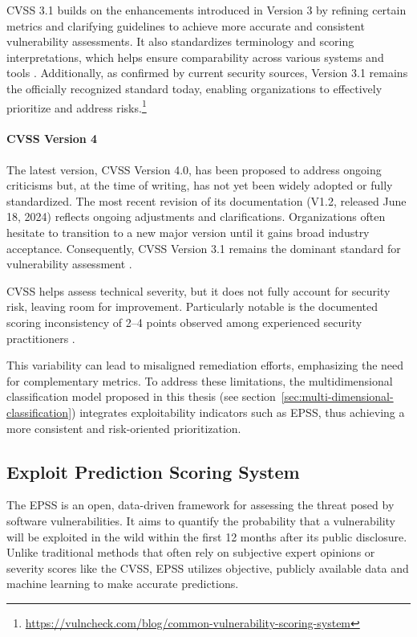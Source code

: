 \ac{CVSS} 3.1 builds on the enhancements introduced in Version 3 by refining certain metrics and clarifying guidelines to achieve more accurate and consistent vulnerability assessments. It also standardizes terminology and scoring interpretations, which helps ensure comparability across various systems and tools \autocite{first_cvss_2024}. Additionally, as confirmed by current security sources, Version 3.1 remains the officially recognized standard today, enabling organizations to effectively prioritize and address risks.\footnote{\url{https://vulncheck.com/blog/common-vulnerability-scoring-system}}

\paragraph{CVSS Version 4}
\label{par:cvss-v4}

The latest version, \ac{CVSS} Version 4.0, has been proposed to address ongoing criticisms but, at the time of writing, has not yet been widely adopted or fully standardized. The most recent revision of its documentation (V1.2, released June 18, 2024) reflects ongoing adjustments and clarifications. Organizations often hesitate to transition to a new major version until it gains broad industry acceptance. Consequently, \ac{CVSS} Version 3.1 remains the dominant standard for vulnerability assessment \autocite{first_cvss_2024_v4}.

\ac{CVSS} helps assess technical severity, but it does not fully account for security risk, leaving room for improvement. Particularly notable is the documented scoring inconsistency of 2–4 points observed among experienced security practitioners \autocite{spring_time_2021}. 

This variability can lead to misaligned remediation efforts, emphasizing the need for complementary metrics. To address these limitations, the multidimensional classification model proposed in this thesis (see section~\ref{sec:multi-dimensional-classification}) integrates exploitability indicators such as \ac{EPSS}, thus achieving a more consistent and risk-oriented prioritization.

\subsection{Exploit Prediction Scoring System}
\label{subsec:epss-theoretical-basis}

The \ac{EPSS} is an open, data-driven framework for assessing the threat posed by software vulnerabilities. It aims to quantify the probability that a vulnerability will be exploited in the wild within the first 12 months after its public disclosure. Unlike traditional methods that often rely on subjective expert opinions or severity scores like the \ac{CVSS}, \ac{EPSS} utilizes objective, publicly available data and machine learning to make accurate predictions.

